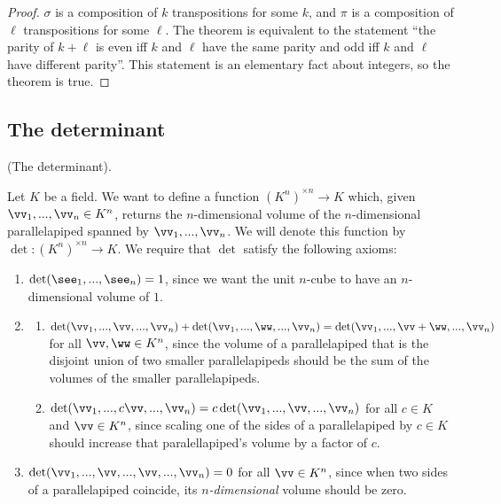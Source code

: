\begin{proof}
    $\sigma$ is a composition of $k$ transpositions for some $k$, and $\pi$ is a composition of $\ell$ transpositions for some $\ell$. The theorem is equivalent to the statement ``the parity of $k + \ell$ is even iff $k$ and $\ell$ have the same parity and odd iff $k$ and $\ell$ have different parity''. This statement is an elementary fact about integers, so the theorem is true.
\end{proof}

\newpage

\subsection*{The determinant}

\begin{defn}
\label{ch::lin_alg::defn::determinant}
    (The determinant).
    
    Let $K$ be a field. We want to define a function $(K^n)^{\times n} \rightarrow K$ which, given $\vv_1, ..., \vv_n \in K^n$, returns the $n$-dimensional volume of the $n$-dimensional parallelapiped spanned by $\vv_1, ..., \vv_n$. We will denote this function by $\det:(K^n)^{\times n} \rightarrow K$. We require that $\det$ satisfy the following axioms:
    
    \begin{enumerate}
        \item $\det(\see_1, ..., \see_n) = 1$, since we want the unit $n$-cube to have an $n$-dimensional volume of $1$.
        \item
        \begin{enumerate}
            \item[2.1.]
            $\det(\vv_1, ..., \vv, ..., \vv_n) + \det(\vv_1, ..., \ww, ..., \vv_n) = \det(\vv_1, ..., \vv + \ww, ..., \vv_n)$ for all $\vv, \ww \in K^n$, since the volume of a parallelapiped that is the disjoint union of two smaller parallelapipeds should be the sum of the volumes of the smaller parallelapipeds.
            \item[2.2.] $\det(\vv_1, ..., c\vv, ..., \vv_n) = c\det(\vv_1, ..., \vv, ..., \vv_n)$ for all $c \in K$ and $\vv \in K^n$, since scaling one of the sides of a parallelapiped by $c \in K$ should increase that paralellapiped's volume by a factor of $c$. 
        \end{enumerate}
        \item $\det(\vv_1, ..., \vv, ..., \vv, ..., \vv_n) = 0$ for all $\vv \in K^n$, since when two sides of a parallelapiped coincide, its \textit{$n$-dimensional} volume should be zero.
    \end{enumerate}
\end{defn}

